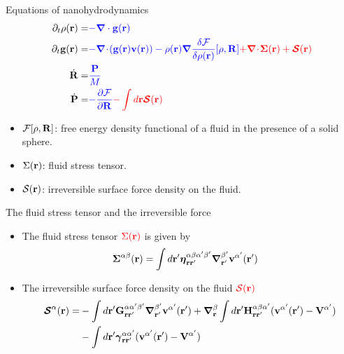 \documentclass{beamer}
\newcommand{\esc}{\!\cdot\!}
\begin{document}
\begin{frame}{Equations of nanohydrodynamics}
\begin{align}
  \partial_t\rho({\bf r})=&{\color{blue} -\boldsymbol{\nabla}\cdot{\bf g}({\bf r})}
\nonumber\\
\partial_t{\bf g}({\bf r})=&{\color{blue} -\boldsymbol{\nabla}\esc{\left({\bf g}({\bf r}){\bf v}({\bf r})\right)}
-\rho({\bf r})\boldsymbol{\nabla}\frac{\delta {\cal F}}{\delta\rho({\bf r})}[\rho,{\bf R}]}
{\color{red} +\boldsymbol{\nabla}\esc\boldsymbol{\Sigma}({\bf r})+\boldsymbol{{\cal S}}({\bf r})}
\nonumber\\
\dot{\bf R}=&{\color{blue} \frac{\bf P}{M}}
\nonumber\\
\dot{\bf P}=&{\color{blue} -\frac{\partial {\cal F}}{\partial {\bf R}}}
{\color{red} -\int d {{\bf r}}\boldsymbol{{\cal S}}({\bf r})}
\nonumber
\end{align}

\begin{itemize}
  \item ${\cal F}[\rho, {\bf R}]$: free energy density functional of a fluid in the presence of a solid sphere.
  \item $\Sigma({\bf r})$: fluid stress tensor.
  \item ${\cal S}({\bf r})$: irreversible surface force density on the fluid.
\end{itemize}
\end{frame}

\begin{frame}{The fluid stress tensor and the irreversible force}
  \begin{itemize}
    \item<1-> The fluid stress tensor ${\color{red} \Sigma({\bf r})}$ is given by 
  \begin{align}
  \boldsymbol{\Sigma}^{\alpha\beta}({\bf r})&=
\int d{\bf r}'
\boldsymbol{\eta}^{\alpha\beta\alpha'\beta'}_{{\bf r}{\bf r}'}
\boldsymbol{\nabla}_{{\bf r}'}^{\beta'}{\bf v}^{\alpha'}({\bf r}')
\nonumber
\end{align}
\item<2-> The irreversible surface force density on the fluid ${\color{red} {\cal S}({\bf r})}$
\begin{align}
  \boldsymbol{{\cal S}}^\alpha({\bf r})=&
-\int d{\bf r}'{\bf G}^{\alpha\alpha'\beta'}_{{\bf r}{\bf r}'}
\boldsymbol{\nabla}_{{\bf r}'}^{\beta'} {\bf v}^{\alpha'}({\bf r}')
+\boldsymbol{\nabla}_{{\bf r}}^{\beta}\int d{\bf r}'{\bf H}^{\alpha\beta\alpha'}_{{\bf r}{\bf r}'}
( {\bf v}^{\alpha'}({\bf r}')-{\bf V}^{\alpha'})
\nonumber\\
&-\int d{\bf r}'
\boldsymbol{\gamma}^{\alpha\alpha'}_{{\bf r}{\bf r}'}( {\bf v}^{\alpha'}({\bf r}')
-{\bf V}^{\alpha'})
\nonumber
\end{align}
\end{itemize}
\end{frame}
\end{document}
